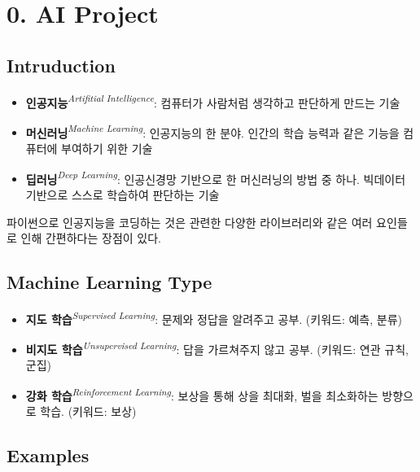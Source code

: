 \section[0. AI Project]{0. AI Project}

\subsection{Intruduction}

\begin{itemize}
\item \textbf{인공지능}\textit{\textsuperscript{Artifitial Intelligence}}: 컴퓨터가 사람처럼 생각하고 판단하게 만드는 기술
\item \textbf{머신러닝}\textit{\textsuperscript{Machine Learning}}: 인공지능의 한 분야. 인간의 학습 능력과 같은 기능을 컴퓨터에 부여하기 위한 기술
\item \textbf{딥러닝}\textit{\textsuperscript{Deep Learning}}: 인공신경망 기반으로 한 머신러닝의 방법 중 하나. 빅데이터 기반으로 스스로 학습하여 판단하는 기술
\end{itemize}

파이썬으로 인공지능을 코딩하는 것은 관련한 다양한 라이브러리와 같은 여러 요인들로 인해 간편하다는 장점이 있다.

\subsection{Machine Learning Type}

\begin{itemize}
\item \textbf{지도 학습}\textit{\textsuperscript{Supervised Learning}}: 문제와 정답을 알려주고 공부. (키워드: 예측, 분류)
\item \textbf{비지도 학습}\textit{\textsuperscript{Unsupervised Learning}}: 답을 가르쳐주지 않고 공부. (키워드: 연관 규칙, 군집)
\item \textbf{강화 학습}\textit{\textsuperscript{Reinforcement Learning}}: 보상을 통해 상을 최대화, 벌을 최소화하는 방향으로 학습. (키워드: 보상)
\end{itemize}

\subsection{Examples}

